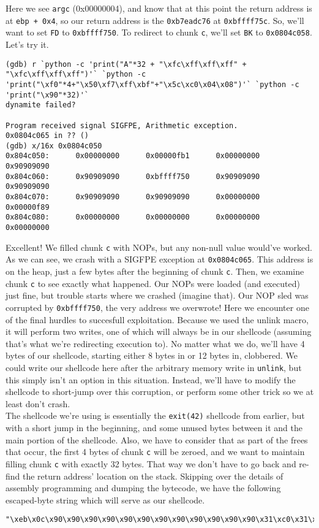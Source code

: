 Here we see \texttt{argc} (0x00000004), and know that at this point the return
address is at \texttt{ebp + 0x4}, so our return address is the \texttt{0xb7eadc76}
at \texttt{0xbffff75c}. So, we'll want to set \texttt{FD} to \texttt{0xbffff750}.
To redirect to chunk \texttt{c}, we'll set \texttt{BK} to \texttt{0x0804c058}.
Let's try it.

\begin{lstlisting}
(gdb) r `python -c 'print("A"*32 + "\xfc\xff\xff\xff" + "\xfc\xff\xff\xff")'` `python -c 'print("\xf0"*4+"\x50\xf7\xff\xbf"+"\x5c\xc0\x04\x08")'` `python -c 'print("\x90"*32)'`
dynamite failed?

Program received signal SIGFPE, Arithmetic exception.
0x0804c065 in ?? ()
(gdb) x/16x 0x0804c050
0x804c050:      0x00000000      0x00000fb1      0x00000000      0x90909090
0x804c060:      0x90909090      0xbffff750      0x90909090      0x90909090
0x804c070:      0x90909090      0x90909090      0x00000000      0x00000f89
0x804c080:      0x00000000      0x00000000      0x00000000      0x00000000
\end{lstlisting}

Excellent! We filled chunk \texttt{c} with NOPs, but any non-null value would've worked.
As we can see, we crash with a SIGFPE exception at \texttt{0x0804c065}. This address is
on the heap, just a few bytes after the beginning of chunk \texttt{c}. Then, we examine
chunk \texttt{c} to see exactly what happened. Our NOPs were loaded (and executed) just
fine, but trouble starts where we crashed (imagine that). Our NOP sled was corrupted
by \texttt{0xbffff750}, the very address we overwrote! Here we encounter one of the
final hurdles to succesfull exploitation. Because we used the unlink macro, it will
perform two writes, one of which will always be in our shellcode (assuming that's what
we're redirecting execution to). No matter what we do, we'll have 4 bytes of our shellcode,
starting either 8 bytes in or 12 bytes in, clobbered. We could write our shellcode
here after the arbitrary memory write in \texttt{unlink}, but this simply isn't
an option in this situation. Instead, we'll have to modify the shellcode to
short-jump over this corruption, or perform some other trick so we at least
don't crash.\\

The shellcode we're using is essentially the \texttt{exit(42)} shellcode from earlier,
but with a short jump in the beginning, and some unused bytes between it and the
main portion of the shellcode. Also, we have to consider that as part
of the frees that occur, the first 4 bytes of chunk \texttt{c} will be zeroed, and
we want to maintain filling chunk \texttt{c} with exactly 32 bytes. That way we
don't have to go back and re-find the return address' location on the stack.
Skipping over the details of assembly programming and dumping the bytecode,
we have the following escaped-byte string which will serve as our shellcode.
\begin{lstlisting}
"\xeb\x0c\x90\x90\x90\x90\x90\x90\x90\x90\x90\x90\x90\x90\x31\xc0\x31\xdb\xb3\x2a\xb0\x01\xcd\x80"
\end{lstlisting}

